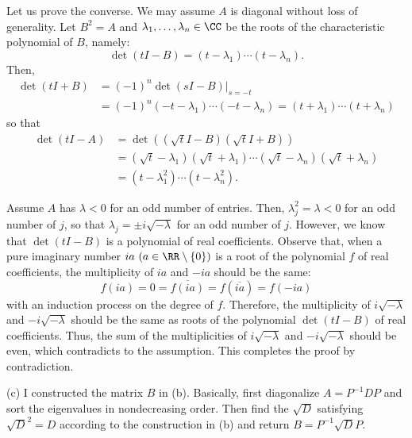 \documentclass{homework}
\begin{document}
{Let us prove the converse. We may assume $A$ is diagonal without loss of generality. Let $B^2 = A$ and $\lambda_1,\dots,\lambda_n\in\CC$ be the roots of the characteristic polynomial of $B$, namely:
\[ \det(tI - B) = (t-\lambda_1)\cdots(t-\lambda_n). \]
Then,
\begin{align*}
    \det(tI + B) & = (-1)^n \det(sI - B)|_{s = -t}
    \\&= (-1)^n (-t-\lambda_1)\cdots (-t-\lambda_n) = (t+\lambda_1)\cdots (t+\lambda_n)
\end{align*}
so that
\begin{align*}
    \det(tI-A) & = \det((\sqrt{t}I-B)(\sqrt{t}I+B))
    \\ &= (\sqrt t - \lambda_1)(\sqrt t + \lambda_1) \cdots (\sqrt t - \lambda_n)(\sqrt t + \lambda_n)
    \\ &= (t-\lambda_1^2)\cdots (t-\lambda_n^2).
\end{align*}

Assume $A$ has $\lambda<0$ for an odd number of entries. Then, $\lambda_j^2 = \lambda<0$ for an odd number of $j$, so that $\lambda_j = \pm i\sqrt{-\lambda}$ for an odd number of $j$. However, we know that $\det(tI - B)$ is a polynomial of real coefficients. Observe that, when a pure imaginary number $ia\ (a\in\RR\setminus \{0\})$ is a root of the polynomial $f$ of real coefficients, the multiplicity of $ia$ and $-ia$ should be the same:
\[ f(ia) = 0 = \overline{f(ia)} = f(\overline{ia}) = f(-ia) \]
with an induction process on the degree of $f$. Therefore, the multiplicity of $i\sqrt{-\lambda}$ and $-i\sqrt{-\lambda}$ should be the same as roots of the polynomial $\det(tI-B)$ of real coefficients. Thus, the sum of the multiplicities of $i\sqrt{-\lambda}$ and $-i\sqrt{-\lambda}$ should be even, which contradicts to the assumption. This completes the proof by contradiction.

\noindent(c) I constructed the matrix $B$ in (b). Basically, first diagonalize $A=P^{-1}DP$ and sort the eigenvalues in nondecreasing order. Then find the $\sqrt{D}$ satisfying $\sqrt{D}^2 = D$ according to the construction in (b) and return $B = P^{-1}\sqrt{D}P$.
}
\end{document}
